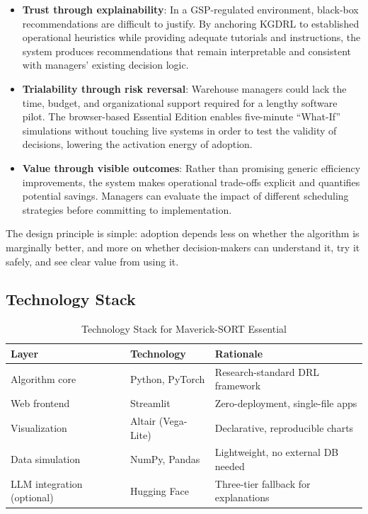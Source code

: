 \begin{itemize}
\item \textbf{Trust through explainability}: In a GSP-regulated environment, black-box recommendations are difficult to justify. By anchoring KGDRL to established operational heuristics while providing adequate tutorials and instructions, the system produces recommendations that remain interpretable and consistent with managers' existing decision logic.

\item \textbf{Trialability through risk reversal}: Warehouse managers could lack the time, budget, and organizational support required for a lengthy software pilot. The browser-based Essential Edition enables five-minute ``What-If'' simulations without touching live systems in order to test the validity of decisions, lowering the activation energy of adoption.

\item \textbf{Value through visible outcomes}: Rather than promising generic efficiency improvements, the system makes operational trade-offs explicit and quantifies potential savings. Managers can evaluate the impact of different scheduling strategies before committing to implementation.


\end{itemize}

The design principle is simple: adoption depends less on whether the algorithm is marginally better, and more on whether decision-makers can understand it, try it safely, and see clear value from using it.



\subsection{Technology Stack}

\begin{table}[htbp]
\centering
\caption{Technology Stack for Maverick-SORT Essential}
\label{tab:stack}
\begin{tabular}{lll}
\hline
Layer & Technology & Rationale \\
\hline
Algorithm core & Python, PyTorch & Research-standard DRL framework \\
Web frontend & Streamlit & Zero-deployment, single-file apps \\
Visualization & Altair (Vega-Lite) & Declarative, reproducible charts \\
Data simulation & NumPy, Pandas & Lightweight, no external DB needed \\
LLM integration (optional) & Hugging Face & Three-tier fallback for explanations \\
\hline
\end{tabular}
\end{table}

